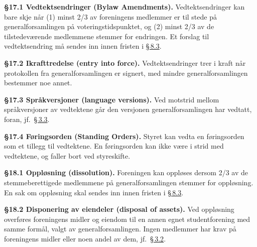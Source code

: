 \documentclass{../../../Common/Latex/Templates/rapport}
\begin{document}
\label{nbylaw:17}
\textbf{\S 17.1 Vedtektsendringer (Bylaw Amendments).}\label{nbylaw:17.1} Vedtektsendringer kan bare skje n\r{a}r (1) minst 2/3 av foreningens medlemmer er til stede p\r{a} generalforsamlingen p\r{a} voteringstidspunktet, og (2) minst 2/3 av de tilstedeværende medlemmene stemmer for endringen. Et forslag til vedtektsendring m\r{a} sendes inn innen fristen i \hyperref[nbylaw:8.3]{\S\,8.3}.

\textbf{\S 17.2 Ikrafttredelse (entry into force).}\label{nbylaw:17.2} Vedtektsendringer trer i kraft n\r{a}r protokollen fra generalforsamlingen er signert, med mindre generalforsamlingen bestemmer noe annet.

\textbf{\S 17.3 Spr\r{a}kversjoner (language versions).}\label{nbylaw:17.3} Ved motstrid mellom spr\r{a}kversjoner av vedtektene g\r{a}r den versjonen generalforsamlingen har vedtatt, foran, jf.\ \hyperref[nbylaw:3.3]{\S\,3.3}.

\textbf{\S 17.4 Føringsorden (Standing Orders).}\label{nbylaw:17.4} Styret kan vedta en føringsorden som et tillegg til vedtektene. En føringsorden kan ikke være i strid med vedtektene, og faller bort ved styreskifte.

\label{nbylaw:18}
\textbf{\S 18.1 Oppløsning (dissolution).}\label{nbylaw:18.1} Foreningen kan oppløses dersom 2/3 av de stemmeberettigede medlemmene p\r{a} generalforsamlingen stemmer for oppløsning. En sak om oppløsning skal sendes inn innen fristen i \hyperref[nbylaw:8.3]{\S\,8.3}.

\textbf{\S 18.2 Disponering av eiendeler (disposal of assets).}\label{nbylaw:18.2} Ved oppløsning overføres foreningens midler og eiendom til en annen egnet studentforening med samme form\r{a}l, valgt av generalforsamlingen. Ingen medlemmer har krav p\r{a} foreningens midler eller noen andel av dem, jf.\ \hyperref[nbylaw:3.2]{\S\,3.2}.
\end{document}
